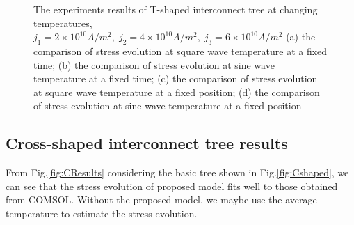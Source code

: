 \begin{figure}[!h]
{\label{fig:TT2Length}}
\caption{The experiments results of T-shaped interconnect tree at changing temperatures, $j_1=2\times10^{10}A/m^2,\;j_2=4\times10^{10}A/m^2,\;j_3=6\times10^{10}A/m^2$ (a) the comparison of stress evolution at square wave temperature at a fixed time; (b) the comparison of stress evolution at sine wave temperature at a fixed time; (c) the comparison of stress evolution at square wave temperature at a fixed position; (d) the comparison of stress evolution at sine wave temperature at a fixed position}
\label{fig:TResults}
\end{figure}

\subsection{Cross-shaped interconnect tree results}
From Fig.\ref{fig:CResults} considering the basic tree shown in Fig.\ref{fig:Cshaped}, we can see that the stress evolution of proposed model fits well to those obtained from COMSOL. Without the proposed model, we maybe use the average temperature to estimate the stress evolution.
